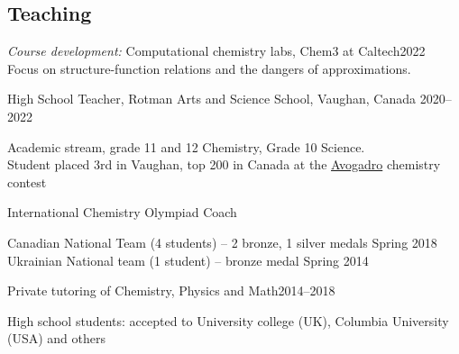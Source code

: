 \documentclass[margin,line]{res}
\newenvironment{list1}{
  \begin{list}{\ding{113}}{%
      \setlength{\itemsep}{0in}
      \setlength{\parsep}{0in} \setlength{\parskip}{0in}
      \setlength{\topsep}{0in} \setlength{\partopsep}{0in} 
      \setlength{\leftmargin}{0.17in}}}{\end{list}}
\begin{document}
\begin{resume}
\section{\sc Teaching}
{\em Course development:} Computational chemistry labs, Chem3 at Caltech\hfill{2022}\\
Focus on structure-function relations and the dangers of approximations.

\vspace{-0.3cm}

High School Teacher, Rotman Arts and Science School, Vaughan, Canada \hfill{2020--2022}

\begin{list1}

\item[] Academic stream, grade 11 and 12 Chemistry, Grade 10 Science. \\
Student placed 3rd in Vaughan, top 200 in Canada at the \href{https://uwaterloo.ca/chemistry/community-outreach/chemistry-high-school-exams}{Avogadro} chemistry contest
\end{list1}

\vspace{-0.3cm}

International Chemistry Olympiad Coach
\begin{list1}
\item[]Canadian National  Team (4 students) -- 2 bronze, 1 silver medals \hfill{Spring 2018}\\
Ukrainian National team (1 student) -- bronze medal \hfill{Spring 2014}
\end{list1}

\vspace{-0.3cm}

Private tutoring of Chemistry, Physics and Math\hfill{2014--2018}

\begin{list1}
\item[]High school students: accepted to University college (UK), Columbia University (USA) and others
\end{list1}

\vspace{-0.3cm}


\end{resume}
\end{document}
